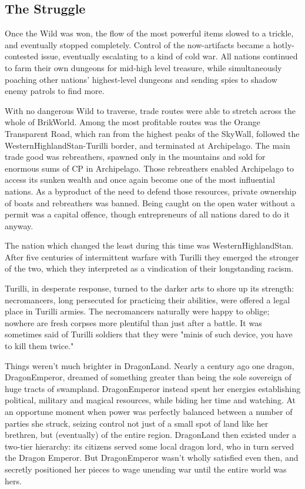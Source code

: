 \documentclass[12pt,a4paper,twocolumn]{article}
\begin{document}
\subsection{The Struggle}

Once the Wild was won, the flow of the most powerful items slowed to a trickle, and eventually stopped completely.  Control of the now-artifacts became a hotly-contested issue, eventually escalating to a kind of cold war.  All nations continued to farm their own dungeons for mid-high level treasure, while simultaneously poaching other nations' highest-level dungeons and sending spies to shadow enemy patrols to find more.  

With no dangerous Wild to traverse, trade routes were able to stretch across the whole of BrikWorld.  Among the most profitable routes was the Orange Transparent Road, which ran from the highest peaks of the SkyWall, followed the WesternHighlandStan-Turilli border, and  terminated at Archipelago.  The main trade good was rebreathers, spawned only in the mountains and sold for enormous sums of CP in Archipelago.  Those rebreathers enabled Archipelago to access its sunken wealth and once again become one of the most influential nations.  As a byproduct of the need to defend those resources, private ownership of boats and rebreathers was banned.  Being caught on the open water without a permit was a capital offence, though entrepreneurs of all nations dared to do it anyway.

The nation which changed the least during this time was WesternHighlandStan.  After five centuries of intermittent warfare with Turilli they emerged the stronger of the two, which they interpreted as a vindication of their longstanding racism.  

Turilli, in desperate response, turned to the darker arts to shore up its strength: necromancers, long persecuted for practicing their abilities, were offered a legal place in Turilli armies.  The necromancers naturally were happy to oblige; nowhere are fresh corpses more plentiful than just after a battle.  It was sometimes said of Turilli soldiers that they were "minis of such device, you have to kill them twice."

Things weren't much brighter in DragonLand.  Nearly a century ago one dragon, DragonEmperor, dreamed of something greater than being the sole sovereign of huge tracts of swampland. DragonEmperor instead spent her energies establishing political, military and magical resources, while biding her time and watching.  At an opportune moment when power was perfectly balanced between a number of parties she struck, seizing control not just of a small spot of land like her brethren, but (eventually) of the entire region.  DragonLand then existed under a two-tier hierarchy: its citizens served some local dragon lord, who in turn served the Dragon Emperor.  But DragonEmperor wasn't wholly satisfied even then, and secretly positioned her pieces to wage unending war until the entire world was hers.
\end{document}
